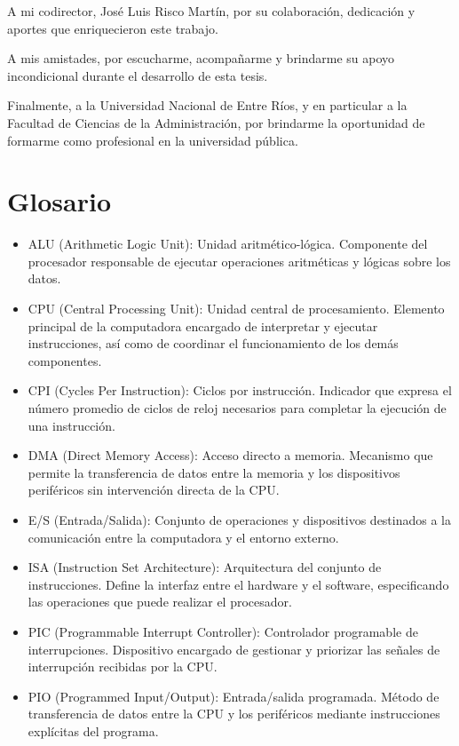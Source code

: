\documentclass[12pt,oneside]{templates/unerthesis}
\begin{document}
A mi codirector, José Luis Risco Martín, por su colaboración, dedicación y aportes que enriquecieron este trabajo.

A mis amistades, por escucharme, acompañarme y brindarme su apoyo incondicional durante el desarrollo de esta tesis.

Finalmente, a la Universidad Nacional de Entre Ríos, y en particular a la Facultad de Ciencias de la Administración, por brindarme la oportunidad de formarme como profesional en la universidad pública.

\hypertarget{glosario}{%
\chapter*{Glosario}\label{glosario}}

\begin{itemize}
\item
  ALU (Arithmetic Logic Unit): Unidad aritmético-lógica. Componente del procesador responsable de ejecutar operaciones aritméticas y lógicas sobre los datos.
\item
  CPU (Central Processing Unit): Unidad central de procesamiento. Elemento principal de la computadora encargado de interpretar y ejecutar instrucciones, así como de coordinar el funcionamiento de los demás componentes.
\item
  CPI (Cycles Per Instruction): Ciclos por instrucción. Indicador que expresa el número promedio de ciclos de reloj necesarios para completar la ejecución de una instrucción.
\item
  DMA (Direct Memory Access): Acceso directo a memoria. Mecanismo que permite la transferencia de datos entre la memoria y los dispositivos periféricos sin intervención directa de la CPU.
\item
  E/S (Entrada/Salida): Conjunto de operaciones y dispositivos destinados a la comunicación entre la computadora y el entorno externo.
\item
  ISA (Instruction Set Architecture): Arquitectura del conjunto de instrucciones. Define la interfaz entre el hardware y el software, especificando las operaciones que puede realizar el procesador.
\item
  PIC (Programmable Interrupt Controller): Controlador programable de interrupciones. Dispositivo encargado de gestionar y priorizar las señales de interrupción recibidas por la CPU.
\item
  PIO (Programmed Input/Output): Entrada/salida programada. Método de transferencia de datos entre la CPU y los periféricos mediante instrucciones explícitas del programa.

\end{itemize}
\end{document}
